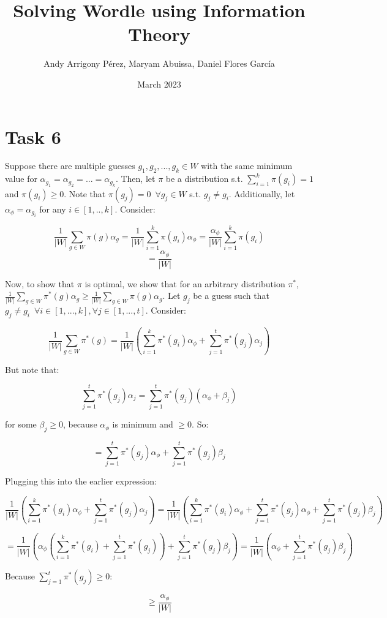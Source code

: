 \documentclass{article}
\title{Solving Wordle using Information Theory}
\author{Andy Arrigony Pérez, Maryam Abuissa, Daniel Flores García}
\date{March 2023}
\begin{document}
\maketitle

\section{Task 6}

Suppose there are multiple guesses $g_1, g_2, ..., g_k \in W$ with the same minimum value for $\alpha_{g_1} = \alpha_{g_2} = ... = \alpha_{g_k}$. Then, let $\pi$ be a distribution s.t. $\sum_{i =1}^{k} \pi(g_i) = 1$ and $\pi(g_i) \geq 0$. Note that $\pi(g_j) = 0 \,\,\, \forall g_j \in W$ s.t.  $g_j \neq g_i$. Additionally, let $\alpha_{\phi} = \alpha_{g_i}$ for any $i \in [1,..,k].$ Consider:

\[
    \frac{1}{|W|}\sum_{g \in W} \pi(g) \alpha_g = \frac{1}{|W|}\sum_{i = 1}^{k} \pi(g_i) \alpha_\phi = \frac{\alpha_\phi}{|W|}\sum_{i=1}^{k}\pi(g_i) 
\]
\[
    = \frac{\alpha_\phi}{|W|}
\]

Now, to show that $\pi$ is optimal, we show that for an arbitrary distribution $\pi^*$, $ \frac{1}{|W|}\sum_{g \in W} \pi^*(g) \alpha_g \geq  \frac{1}{|W|}\sum_{g \in W} \pi(g) \alpha_g$. Let $g_j$ be a guess such that $g_j \neq g_i \,\,\, \forall  i \in [1, ..., k], \forall j \in [1, ..., t]$. Consider:



\[
    \frac{1}{|W|}\sum_{g \in W} \pi^*(g) = \frac{1}{|W|}(\sum_{i = 1}^{k} \pi^*(g_i) \alpha_\phi + \sum_{j = 1}^{t} \pi^*(g_j)\alpha_j)
\]

But note that: 

\[
    \sum_{j = 1}^{t} \pi^*(g_j)\alpha_j = \sum_{j = 1}^{t} \pi^*(g_j) (\alpha_\phi + \beta_j)
\]

for some $\beta_j \geq 0$, because $\alpha_\phi$ is minimum and $\geq 0$. So:

\[
    = \sum_{j = 1}^{t} \pi^*(g_j) \alpha_\phi + \sum_{j = 1}^{t} \pi^*(g_j) \beta_j
\]

Plugging this into the earlier expression: 

\[
    \frac{1}{|W|}(\sum_{i = 1}^{k} \pi^*(g_i) \alpha_\phi + \sum_{j = 1}^{t} \pi^*(g_j)\alpha_j) = \frac{1}{|W|}(\sum_{i = 1}^{k} \pi^*(g_i) \alpha_\phi + \sum_{j = 1}^{t} \pi^*(g_j) \alpha_\phi + \sum_{j = 1}^{t} \pi^*(g_j) \beta_j)
\]

\[
    = \frac{1}{|W|}(\alpha_\phi (\sum_{i = 1}^{k} \pi^*(g_i)  + \sum_{j = 1}^{t} \pi^*(g_j)) + \sum_{j = 1}^{t} \pi^*(g_j) \beta_j) = \frac{1}{|W|}(\alpha_\phi + \sum_{j = 1}^{t} \pi^*(g_j) \beta_j)
\]

Because $\sum_{j = 1}^{t} \pi^*(g_j) \geq 0$:

\[
    \geq \frac{\alpha_\phi}{|W|}
\]
\end{document}
